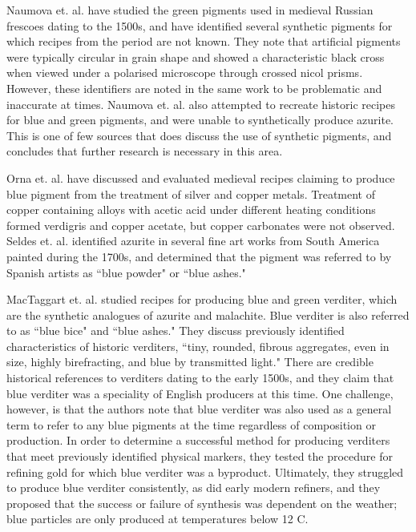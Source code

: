 Naumova et. al. have studied the green pigments used in medieval Russian frescoes dating to the 1500s, and have identified several synthetic pigments for which recipes from the period are not known. They note that artificial pigments were typically circular in grain shape and showed a characteristic black cross when viewed under a polarised microscope through crossed nicol prisms. However, these identifiers are noted in the same work to be problematic and inaccurate at times. Naumova et. al. also attempted to recreate historic recipes for blue and green pigments, and were unable to synthetically produce azurite. This is one of few sources that does discuss the use of synthetic pigments, and concludes that further research is necessary in this area.~\cite{naumova 1, naumova 2}

Orna et. al. have discussed and evaluated medieval recipes claiming to produce blue pigment from the treatment of silver and copper metals. Treatment of copper containing alloys with acetic acid under different heating conditions formed verdigris and copper acetate, but copper carbonates were not observed.~\cite{orna 1, orna 2} Seldes et. al. identified azurite in several fine art works from South America painted during the 1700s, and determined that the pigment was referred to by Spanish artists as ``blue powder" or ``blue ashes." 

MacTaggart et. al. studied recipes for producing blue and green verditer, which are the synthetic analogues of azurite and malachite. Blue verditer is also referred to as ``blue bice" and ``blue ashes." They discuss previously identified characteristics of historic verditers, ``tiny, rounded, fibrous aggregates, even in size, highly birefracting, and blue by transmitted light." There are credible historical references to verditers dating to the early 1500s, and they claim that blue verditer was a speciality of English producers at this time. One challenge, however, is that the authors note that blue verditer was also used as a general term to refer to any blue pigments at the time regardless of composition or production. In order to determine a successful method for producing verditers that meet previously identified physical markers, they tested the procedure for refining gold for which blue verditer was a byproduct. Ultimately, they struggled to produce blue verditer consistently, as did early modern refiners, and they proposed that the success or failure of synthesis was dependent on the weather; blue particles are only produced at temperatures below 12 \textdegree C.~\cite{mactaggart}

